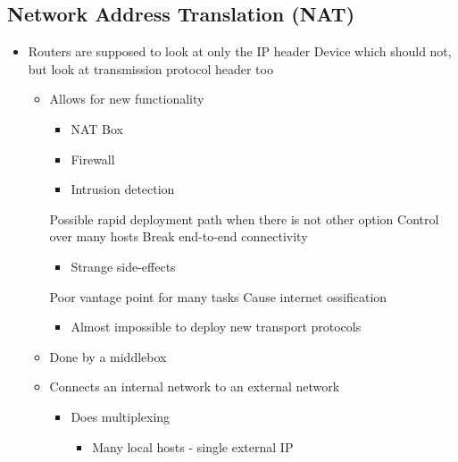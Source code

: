 \subsection{Network Address Translation (NAT)}
\begin{itemize}
    \item Routers are supposed to look at only the IP header
     Device which should not, but look at transmission protocol header too
        \begin{itemize}
            \item Allows for new functionality
                \begin{itemize}
                    \item NAT Box
                    \item Firewall
                    \item Intrusion detection
                \end{itemize}
                \ipro Possible rapid deployment path when there is not other option 
            \ipro Control over many hosts
            \icon Break end-to-end connectivity
                \begin{itemize}
                    \item Strange side-effects
                \end{itemize}
            \icon Poor vantage point for many tasks
            \icon Cause internet ossification
                \begin{itemize}
                    \item Almost impossible to deploy new transport protocols
                \end{itemize}
        \end{itemize}
        \begin{itemize}
            \item Done by a middlebox
            \item Connects an internal network to an external network
                \begin{itemize}
                    \item Does multiplexing
                        \begin{itemize}
                            \item Many local hosts - single external IP
                        \end{itemize}
                \end{itemize}

\end{itemize}
\end{itemize}
